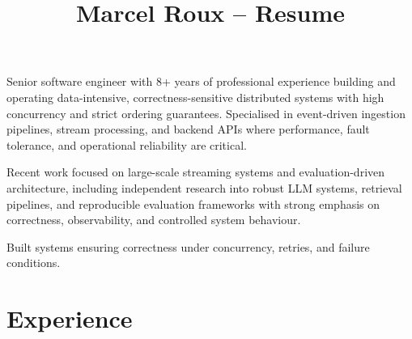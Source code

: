 \documentclass[a4paper,online,extended]{adcv}
\title{Marcel Roux -- Resume}
\begin{document}

{\raggedright
Senior software engineer with 8+ years of professional experience building and operating data-intensive, correctness-sensitive distributed systems with high concurrency and strict ordering guarantees. Specialised in event-driven ingestion pipelines, stream processing, and backend APIs where performance, fault tolerance, and operational reliability are critical.

Recent work focused on large-scale streaming systems and evaluation-driven architecture, including independent research into robust LLM systems, retrieval pipelines, and reproducible evaluation frameworks with strong emphasis on correctness, observability, and controlled system behaviour.

Built systems ensuring correctness under concurrency, retries, and failure conditions.

\par}

\section{Experience}
\end{document}
